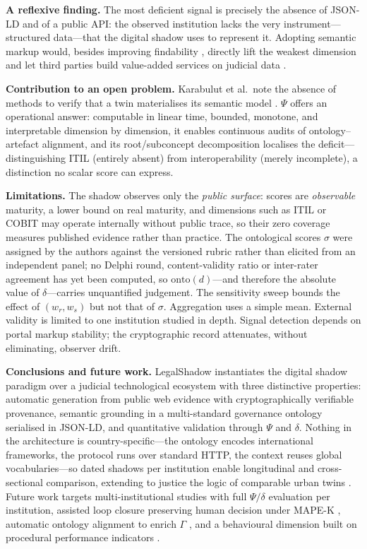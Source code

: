 \documentclass[engproc,proceedingpaper,submit,moreauthors]{Definitions/mdpi}
\begin{document}
\textbf{A reflexive finding.} The most deficient signal is precisely the absence of JSON-LD and of a public API: the observed institution lacks the very instrument---structured data---that the digital shadow uses to represent it. Adopting semantic markup would, besides improving findability \cite{Guha2016}, directly lift the weakest dimension and let third parties build value-added services on judicial data \cite{Attard2015,Wilkinson2016}.

\textbf{Contribution to an open problem.} Karabulut et al.\ note the absence of methods to verify that a twin materialises its semantic model \cite{Karabulut2024}. $\Psi$ offers an operational answer: computable in linear time, bounded, monotone, and interpretable dimension by dimension, it enables continuous audits of ontology--artefact alignment, and its root/subconcept decomposition localises the deficit---distinguishing ITIL (entirely absent) from interoperability (merely incomplete), a distinction no scalar score can express.

\textbf{Limitations.} The shadow observes only the \emph{public surface}: scores are \emph{observable} maturity, a lower bound on real maturity, and dimensions such as ITIL or COBIT may operate internally without public trace, so their zero coverage measures published evidence rather than practice. The ontological scores $\sigma$ were assigned by the authors against the versioned rubric rather than elicited from an independent panel; no Delphi round, content-validity ratio \cite{Lawshe1975} or inter-rater agreement has yet been computed, so $\mathrm{onto}(d)$---and therefore the absolute value of $\delta$---carries unquantified judgement. The sensitivity sweep bounds the effect of $(w_r,w_s)$ but not that of $\sigma$. Aggregation uses a simple mean. External validity is limited to one institution studied in depth. Signal detection depends on portal markup stability; the cryptographic record attenuates, without eliminating, observer drift.

\textbf{Conclusions and future work.} LegalShadow instantiates the digital shadow paradigm over a judicial technological ecosystem with three distinctive properties: automatic generation from public web evidence with cryptographically verifiable provenance, semantic grounding in a multi-standard governance ontology serialised in JSON-LD, and quantitative validation through $\Psi$ and $\delta$. Nothing in the architecture is country-specific---the ontology encodes international frameworks, the protocol runs over standard HTTP, the context reuses global vocabularies---so dated shadows per institution enable longitudinal and cross-sectional comparison, extending to justice the logic of comparable urban twins \cite{Shahat2021}. Future work targets multi-institutional studies with full $\Psi/\delta$ evaluation per institution, assisted loop closure preserving human decision under MAPE-K \cite{Kephart2003}, automatic ontology alignment to enrich $\Gamma$ \cite{Hogan2021}, and a behavioural dimension built on procedural performance indicators \cite{Medvedeva2020}.
\end{document}
